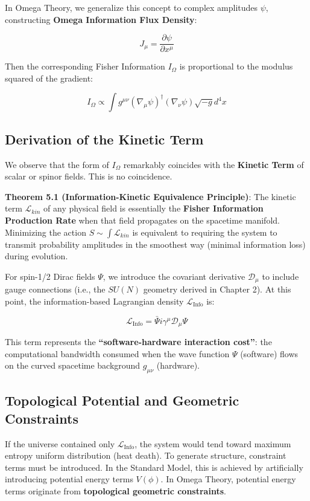 In Omega Theory, we generalize this concept to complex amplitudes $\psi$, constructing \textbf{Omega Information Flux Density}:

\[J_\mu = \frac{\partial \psi}{\partial x^\mu}\]

Then the corresponding Fisher Information $I_\Omega$ is proportional to the modulus squared of the gradient:

\[I_\Omega \propto \int g^{\mu\nu} (\nabla_\mu \psi)^\dagger (\nabla_\nu \psi) \sqrt{-g} d^4x\]

\subsection{Derivation of the Kinetic Term}

We observe that the form of $I_\Omega$ remarkably coincides with the \textbf{Kinetic Term} of scalar or spinor fields. This is no coincidence.

\textbf{Theorem 5.1 (Information-Kinetic Equivalence Principle)}:
The kinetic term $\mathcal{L}_{kin}$ of any physical field is essentially the \textbf{Fisher Information Production Rate} when that field propagates on the spacetime manifold. Minimizing the action $S \sim \int \mathcal{L}_{kin}$ is equivalent to requiring the system to transmit probability amplitudes in the smoothest way (minimal information loss) during evolution.

For spin-1/2 Dirac fields $\Psi$, we introduce the covariant derivative $\mathcal{D}_\mu$ to include gauge connections (i.e., the $SU(N)$ geometry derived in Chapter 2). At this point, the information-based Lagrangian density $\mathcal{L}_{\text{Info}}$ is:

\[\mathcal{L}_{\text{Info}} = \bar{\Psi} i \gamma^\mu \mathcal{D}_\mu \Psi\]

This term represents the \textbf{``software-hardware interaction cost''}: the computational bandwidth consumed when the wave function $\Psi$ (software) flows on the curved spacetime background $g_{\mu\nu}$ (hardware).

\subsection{Topological Potential and Geometric Constraints}

If the universe contained only $\mathcal{L}_{\text{Info}}$, the system would tend toward maximum entropy uniform distribution (heat death). To generate structure, constraint terms must be introduced. In the Standard Model, this is achieved by artificially introducing potential energy terms $V(\phi)$. In Omega Theory, potential energy terms originate from \textbf{topological geometric constraints}.

